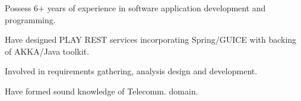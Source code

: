   
\begin{cvsummaryitems}
        \item {Possess 6+ years of experience in software application development and programming.}
  \item {Have designed PLAY REST services incorporating Spring/GUICE with backing of AKKA/Java toolkit.}
   \item {Involved in requirements gathering, analysis design and development.}
    \item {Have formed sound knowledge of Telecomm. domain.}
             \end{cvsummaryitems}

